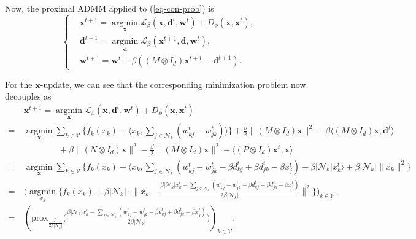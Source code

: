 \documentclass[
  letterpaper,
  DIV=11,
  numbers=noendperiod]{scrartcl}
\theoremstyle{plain}
\theoremstyle{remark}
\begin{document}
Now, the proximal ADMM applied to (\ref{eq-con-prob}) is \[
\left\{
  \begin{aligned}
    & \mathbf{x}^{t+1} = \operatorname*{argmin}_{\mathbf{x}} \mathcal{L}_{\beta}(\mathbf{x}, \mathbf{d}^t, \mathbf{w}^t) + D_{\phi}(\mathbf{x}, \mathbf{x}^t), \\
    & \mathbf{d}^{t+1} = \operatorname*{argmin}_{\mathbf{d}} \mathcal{L}_{\beta}(\mathbf{x}^{t+1}, \mathbf{d}, \mathbf{w}^t), \\
    & \mathbf{w}^{t+1} = \mathbf{w}^t + \beta ((M \otimes I_d) \mathbf{x}^{t+1} - \mathbf{d}^{t+1}).
  \end{aligned}
\right.
\]

For the \(\mathbf{x}\)-update, we can see that the corresponding
minimization problem now decouples as \begin{align*}
  &~\mathbf{x}^{t+1} = \operatorname*{argmin}_{\mathbf{x}} \mathcal{L}_{\beta}(\mathbf{x}, \mathbf{d}^t, \mathbf{w}^t) + D_{\phi}(\mathbf{x}, \mathbf{x}^t) \\
  = &~\operatorname*{argmin}_{\mathbf{x}} \sum_{k \in \mathcal{V}} \Big\{ f_k(x_k) + \langle x_k, \sum_{j \in \mathcal{N}_k} (w_{kj}^t - w_{jk}^t) \rangle \Big\} + \frac{\beta}{2} \| (M \otimes I_d) \mathbf{x} \|^2 - \beta \langle (M \otimes I_d) \mathbf{x}, \mathbf{d}^t \rangle \\
  &~ \quad \quad \quad \quad + \beta \| (N \otimes I_d) \mathbf{x} \|^2 - \frac{\beta}{2} \| (M \otimes I_d) \mathbf{x} \|^2 - \langle (P \otimes I_d) \mathbf{x}^t, \mathbf{x} \rangle \\
  = &~\operatorname*{argmin}_{\mathbf{x}} \sum_{k \in \mathcal{V}} \Bigg\{ f_k(x_k) + \langle x_k, \sum_{j \in \mathcal{N}_k} (w_{kj}^t - w_{jk}^t - \beta d_{kj}^t + \beta d_{jk}^t - \beta x_j^t) - \beta | \mathcal{N}_k | x_k^t \rangle + \beta | \mathcal{N}_k | \| x_k \|^2  \Bigg\} \\
  = &~\Bigg(\operatorname*{argmin}_{x_k} \Bigg\{f_k(x_k) + \beta | \mathcal{N}_k | \cdot \Big\| x_k - \frac{\beta | \mathcal{N}_k | x_k^t - \sum_{j \in \mathcal{N}_k} (w_{kj}^t - w_{jk}^t - \beta d_{kj}^t + \beta d_{jk}^t - \beta x_j^t) }{2\beta | \mathcal{N}_k |} \Big\|^2 \Bigg\}\Bigg)_{k \in \mathcal{V}} \\
  = &~\left( \textrm{prox}_{\frac{f_k}{2\beta | \mathcal{N}_k |}} \Big( \frac{\beta | \mathcal{N}_k | x_k^t - \sum_{j \in \mathcal{N}_k} (w_{kj}^t - w_{jk}^t - \beta d_{kj}^t + \beta d_{jk}^t - \beta x_j^t)}{2\beta | \mathcal{N}_k |} \Big) \right)_{k \in \mathcal{V}}.
\end{align*}
\end{document}
